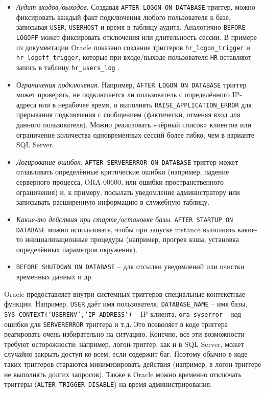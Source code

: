  \begin{itemize}
    \item \textit{Аудит входов/выходов}. Создавая \texttt{AFTER LOGON ON DATABASE} триггер, можно фиксировать каждый факт подключения любого пользователя к базе, записывая \texttt{USER}, \texttt{USERHOST} и время в таблицу аудита. Аналогично \texttt{BEFORE LOGOFF} может фиксировать отключения или длительность сессии. В примере из документации Oracle показано создание триггеров \texttt{hr\_logon\_trigger} и \texttt{hr\_logoff\_trigger}, которые при входе/выходе пользователя \texttt{HR} вставляют запись в таблицу \texttt{hr\_users\_log} \autocite{oracledbdoc8}.
    \item \textit{Ограничения подключения}. Например, \texttt{AFTER LOGON ON DATABASE} триггер может проверять, не подключается ли пользователь с определённого IP-адреса или в нерабочее время, и выполнять \texttt{RAISE\_APPLICATION\_ERROR} для прерывания подключения с сообщением (фактически, отменяя вход для данного пользователя). Можно реализовать «чёрный список» клиентов или ограничение количества одновременных сессий более гибко, чем в варианте SQL Server.
    \item \textit{Логирование ошибок}. \texttt{AFTER SERVERERROR ON DATABASE} триггер может отлавливать определённые критические ошибки (например, падение серверного процесса, ORA-00600, или ошибки пространственного ограничения) и, к примеру, посылать уведомление администратору или записывать расширенную информацию в служебную таблицу.
    \item \textit{Какие-то действия при старте/остановке базы}. \texttt{AFTER STARTUP ON DATABASE} можно использовать, чтобы при запуске instance выполнять какие-то инициализационные процедуры (например, прогрев кэша, установка определённых параметров окружения).
    \item \texttt{BEFORE SHUTDOWN ON DATABASE} – для отсылки уведомлений или очистки временных данных и др.
 \end{itemize}

 Oracle предоставляет внутри системных триггеров специальные контекстные функции. Например, \texttt{USER} даёт имя пользователя, \texttt{DATABASE\_NAME} – имя базы, \texttt{SYS\_CONTEXT('USERENV','IP\_ADDRESS')} – IP клиента, \texttt{ora\_syserror} – код ошибки для \texttt{SERVERERROR} триггера и т.д. Это позволяет в коде триггера реагировать очень избирательно на ситуацию.
 Конечно, все эти возможности требуют осторожности: например, логон-триггер, как и в SQL Server, может случайно закрыть доступ ко всем, если содержит баг. Поэтому обычно в коде таких триггеров стараются минимизировать действия (например, в логон-триггере не выполнять долгих запросов). Также в Oracle можно временно отключать триггеры (\texttt{ALTER TRIGGER DISABLE}) на время администрирования.

